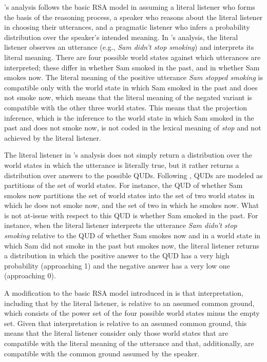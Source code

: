 \documentclass[11pt,fleqn]{article}
\newcommand{\6}{\mbox{$[\hspace*{-.6mm}[$}}
\newcommand{\9}{\mbox{$]\hspace*{-.6mm}]$}}
\newcommand{\citepos}[1]{\citeauthor{#1}'s \citeyear{#1}}
\begin{document}
\citepos{qing-etal2016} analysis follows the basic RSA model in assuming a literal listener who forms the basis of the reasoning process, a speaker who reasons about the literal listener in choosing their utterances, and a pragmatic listener who infers a probability distribution over the speaker's intended meaning.  In \citepos{qing-etal2016} analysis, the literal listener observes an utterance (e.g., {\em Sam didn't stop smoking}) and interprets its literal meaning. There are four possible world states against which utterances are interpreted; these differ in whether Sam smoked in the past, and in whether Sam smokes now. The literal meaning of the positive utterance {\em Sam stopped smoking} is compatible only with the world state in which Sam smoked in the past and does not smoke now, which means that the literal meaning of the negated variant is compatible with the other three world states. This means that the projection inference, which is the inference to the world state in which Sam smoked in the past and does not smoke now, is not coded in the lexical meaning of {\em stop} and not achieved by the literal listener.

The literal listener in \citepos{qing-etal2016} analysis does not simply return a distribution over the world states in which the utterance is literally true, but it rather returns a distribution over answers to the possible QUDs. Following \citealt{kao-etal2014}, QUDs are modeled as partitions of the set of world states. For instance, the QUD of whether Sam smokes now partitions the set of world states into the set of two world states in which he does not smoke now, and the set of two in which he smokes now. What is not at-issue with respect to this QUD is whether Sam smoked in the past. For instance, when the literal listener interprets the utterance {\em Sam didn't stop smoking} relative to the QUD of whether Sam smokes now and in a world state in which Sam did not smoke in the past but smokes now, the literal listener returns a distribution in which the positive answer to the QUD has a very high probability (approaching 1) and the negative answer has a very low one (approaching 0). 

A modification to the basic RSA model introduced in \citealt{qing-etal2016} is that interpretation, including that by the literal listener, is relative to an assumed common ground, which consists of the power set of the four possible world states minus the empty set. Given that interpretation is relative to an assumed common ground, this means that the literal listener consider only those world states that are compatible with the literal meaning of the utterance and that, additionally, are compatible with the common ground assumed by the speaker.
\end{document}
